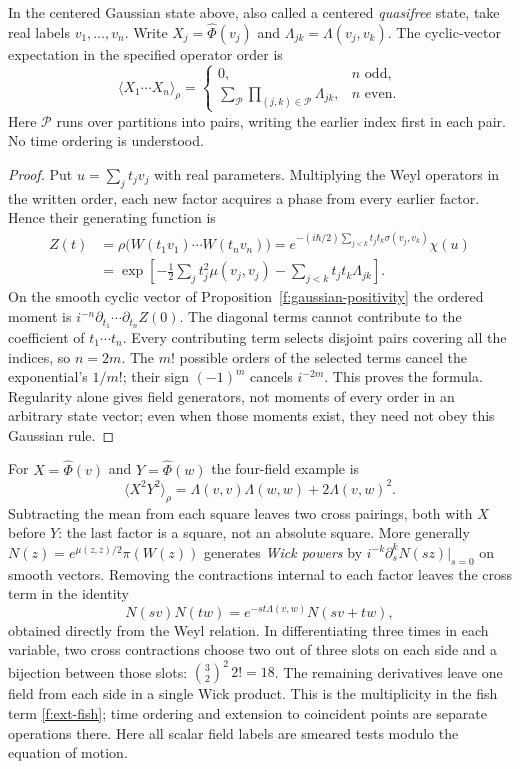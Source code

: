 \begin{corollary}\label{f:wick-pairings}
In the centered Gaussian state above, also called a centered \emph{quasifree} state, take real labels $v_1,\ldots,v_n$. Write $X_j=\widehat\Phi(v_j)$ and $\Lambda_{jk}=\Lambda(v_j,v_k)$. The cyclic-vector expectation in the specified operator order is
\[
 \langle X_1\cdots X_n\rangle_\rho=
 \begin{cases}
  0, & n\text{ odd},\\[2pt]
  \displaystyle\sum_{\mathcal P}\prod_{(j,k)\in\mathcal P}\Lambda_{jk}, & n\text{ even}.
 \end{cases}
\]
Here $\mathcal P$ runs over partitions into pairs, writing the earlier index first in each pair. No time ordering is understood.
\end{corollary}
\begin{proof}
Put $u=\sum_j t_jv_j$ with real parameters. Multiplying the Weyl operators in the written order, each new factor acquires a phase from every earlier factor. Hence their generating function is
\begin{align*}
 Z(t)&=\rho\big(W(t_1v_1)\cdots W(t_nv_n)\big)
 =e^{-(i\hbar/2)\sum_{j<k}t_jt_k\sigma(v_j,v_k)}\chi(u)\\
 &=\exp\!\left[-\tfrac12\sum_j t_j^2\mu(v_j,v_j)
                       -\sum_{j<k}t_jt_k\Lambda_{jk}\right].
\end{align*}
On the smooth cyclic vector of Proposition~\ref{f:gaussian-positivity} the ordered moment is $i^{-n}\partial_{t_1}\cdots\partial_{t_n}Z(0)$. The diagonal terms cannot contribute to the coefficient of $t_1\cdots t_n$. Every contributing term selects disjoint pairs covering all the indices, so $n=2m$. The $m!$ possible orders of the selected terms cancel the exponential's $1/m!$; their sign $(-1)^m$ cancels $i^{-2m}$. This proves the formula. Regularity alone gives field generators, not moments of every order in an arbitrary state vector; even when those moments exist, they need not obey this Gaussian rule.
\end{proof}

For $X=\widehat\Phi(v)$ and $Y=\widehat\Phi(w)$ the four-field example is
\[
 \langle X^2Y^2\rangle_\rho
 =\Lambda(v,v)\Lambda(w,w)+2\Lambda(v,w)^2 .
\]
Subtracting the mean from each square leaves two cross pairings, both with $X$ before $Y$: the last factor is a square, not an absolute square. More generally $N(z)=e^{\mu(z,z)/2}\pi(W(z))$ generates \emph{Wick powers} by $i^{-k}\partial_s^k N(sz)|_{s=0}$ on smooth vectors. Removing the contractions internal to each factor leaves the cross term in the identity
\[
 N(sv)N(tw)=e^{-st\Lambda(v,w)}N(sv+tw),
\]
obtained directly from the Weyl relation. In differentiating three times in each variable, two cross contractions choose two out of three slots on each side and a bijection between those slots: $\binom32^2\,2!=18$. The remaining derivatives leave one field from each side in a single Wick product. This is the multiplicity in the fish term \eqref{f:ext-fish}; time ordering and extension to coincident points are separate operations there. Here all scalar field labels are smeared tests modulo the equation of motion.


